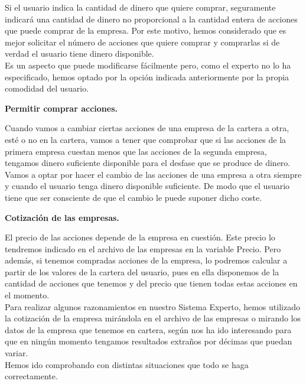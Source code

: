 \documentclass[12pt]{article}
\begin{document}
Si el usuario indica la cantidad de dinero que quiere comprar, seguramente indicará una cantidad de dinero no proporcional a la cantidad entera de acciones que puede comprar de la empresa. Por este motivo, hemos considerado que es mejor solicitar el número de acciones que quiere comprar y comprarlas si de verdad el usuario tiene dinero disponible. \\

Es un aspecto que puede modificarse fácilmente pero, como el experto no lo ha especificado, hemos optado por la opción indicada anteriormente por la propia comodidad del usuario. \\

\begin{center}
	\textbf{Permitir comprar acciones.}
\end{center}
Cuando vamos a cambiar ciertas acciones de una empresa de la cartera a otra, esté o no en la cartera, vamos a tener que comprobar que si las acciones de la primera empresa cuestan menos que las acciones de la segunda empresa, tengamos dinero suficiente disponible para el desfase que se produce de dinero.\\

Vamos a optar por hacer el cambio de las acciones de una empresa a otra siempre y cuando el usuario tenga dinero disponible suficiente. De modo que el usuario tiene que ser consciente de que el cambio le puede suponer dicho coste.\\

\begin{center}
	\textbf{Cotización de las empresas.}
\end{center}
El precio de las acciones depende de la empresa en cuestión. Este precio lo tendremos indicado en el archivo de las empresas en la variable Precio. Pero además, si tenemos compradas acciones de la empresa, lo podremos calcular a partir de los valores de la cartera del usuario, pues en ella disponemos de la cantidad de acciones que tenemos y del precio que tienen todas estas acciones en el momento.\\

Para realizar algunos razonamientos en nuestro Sistema Experto, hemos utilizado la cotización de la empresa mirándola en el archivo de las empresas o mirando los datos de la empresa que tenemos en cartera, según nos ha ido interesando para que en ningún momento tengamos resultados extraños por décimas que puedan variar. \\

Hemos ido comprobando con distintas situaciones que todo se haga correctamente.\\ 
\end{document}
